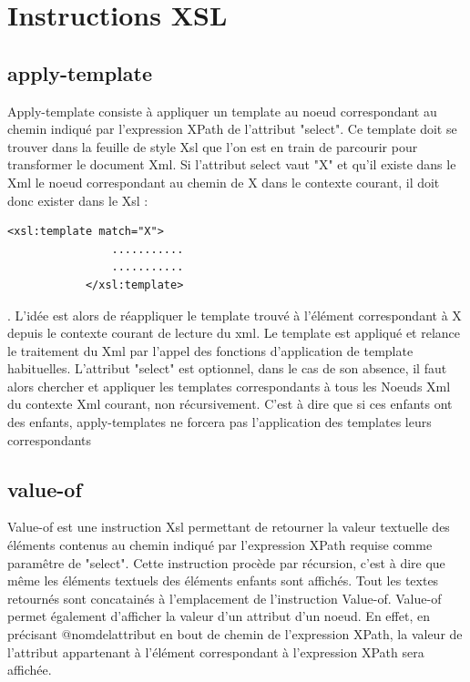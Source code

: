 \section{Instructions XSL}

    \subsection{apply-template}
        Apply-template consiste à appliquer un template au noeud correspondant au chemin indiqué par l'expression XPath de l'attribut "select". Ce template doit se trouver dans la feuille de style Xsl que l'on est en train de parcourir pour transformer le document Xml. Si l'attribut select vaut "X" et qu'il existe dans le Xml le noeud correspondant au chemin de X dans le contexte courant, il doit donc exister dans le Xsl :
        \begin{lstlisting}[frame=single]
            <xsl:template match="X">
                ...........
                ...........
            </xsl:template>
        \end{lstlisting}.
         L'idée est alors de réappliquer le template trouvé à l'élément correspondant à X depuis le contexte courant de lecture du xml.
         Le template est appliqué et relance le traitement du Xml par l'appel des fonctions d'application de template habituelles.
         L'attribut "select" est optionnel, dans le cas de son absence, il faut alors chercher et appliquer les templates correspondants à tous les Noeuds Xml du contexte Xml courant, non récursivement. C'est à dire que si ces enfants ont des enfants, apply-templates ne forcera pas l'application des templates leurs correspondants

    \subsection{value-of}
        Value-of est une instruction Xsl permettant de retourner la valeur textuelle des éléments contenus au chemin indiqué par l'expression XPath requise comme paramêtre de "select". Cette instruction procède par récursion, c'est à dire que même les éléments textuels des éléments enfants sont affichés. Tout les textes retournés sont concatainés à l'emplacement de l'instruction Value-of.
        Value-of permet également d'afficher la valeur d'un attribut d'un noeud. En effet, en précisant @nomdelattribut en bout de chemin de l'expression XPath, la valeur de l'attribut appartenant à l'élément correspondant à l'expression XPath sera affichée.

